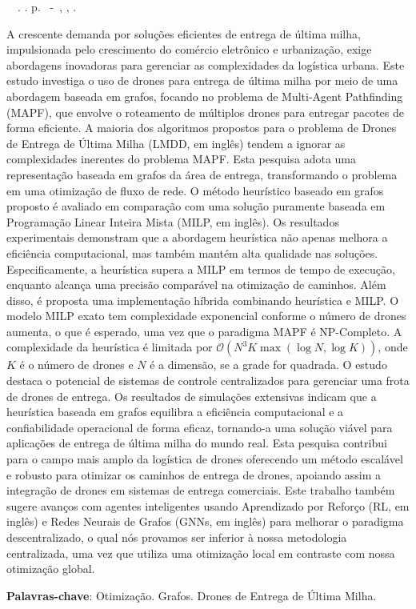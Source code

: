 \setlength{\absparsep}{18pt} %
\begin{resumo}
	\begin{flushleft} 
			\setlength{\absparsep}{0pt} %
			\SingleSpacing 
			\imprimirautorabr~~\textbf{\imprimirtituloresumo}.	\imprimirdata. \pageref{LastPage}p. 
			\imprimirtipotrabalho~-~\imprimirinstituicao, \imprimirlocal, \imprimirdata. 
 	\end{flushleft}
\OnehalfSpacing 	

A crescente demanda por soluções eficientes de entrega de última milha, impulsionada pelo crescimento do comércio eletrônico e urbanização, exige abordagens inovadoras para gerenciar as complexidades da logística urbana. Este estudo investiga o uso de drones para entrega de última milha por meio de uma abordagem baseada em grafos, focando no problema de Multi-Agent Pathfinding (MAPF), que envolve o roteamento de múltiplos drones para entregar pacotes de forma eficiente. A maioria dos algoritmos propostos para o problema de Drones de Entrega de Última Milha (LMDD, em inglês) tendem a ignorar as complexidades inerentes do problema MAPF. Esta pesquisa adota uma representação baseada em grafos da área de entrega, transformando o problema em uma otimização de fluxo de rede. O método heurístico baseado em grafos proposto é avaliado em comparação com uma solução puramente baseada em Programação Linear Inteira Mista (MILP, em inglês). Os resultados experimentais demonstram que a abordagem heurística não apenas melhora a eficiência computacional, mas também mantém alta qualidade nas soluções. Especificamente, a heurística supera a MILP em termos de tempo de execução, enquanto alcança uma precisão comparável na otimização de caminhos. Além disso, é proposta uma implementação híbrida combinando heurística e MILP. O modelo MILP exato tem complexidade exponencial conforme o número de drones aumenta, o que é esperado, uma vez que o paradigma MAPF é NP-Completo. A complexidade da heurística é limitada por $\mathcal{O}(N^3 K \max{(\log N, \log K)})$, onde $K$ é o número de drones e $N$ é a dimensão, se a grade for quadrada. O estudo destaca o potencial de sistemas de controle centralizados para gerenciar uma frota de drones de entrega. Os resultados de simulações extensivas indicam que a heurística baseada em grafos equilibra a eficiência computacional e a confiabilidade operacional de forma eficaz, tornando-a uma solução viável para aplicações de entrega de última milha do mundo real. Esta pesquisa contribui para o campo mais amplo da logística de drones oferecendo um método escalável e robusto para otimizar os caminhos de entrega de drones, apoiando assim a integração de drones em sistemas de entrega comerciais. Este trabalho também sugere avanços com agentes inteligentes usando Aprendizado por Reforço (RL, em inglês) e Redes Neurais de Grafos (GNNs, em inglês) para melhorar o paradigma descentralizado, o qual nós provamos ser inferior à nossa metodologia centralizada, uma vez que utiliza uma otimização local em contraste com nossa otimização global.
 

 \textbf{Palavras-chave}: Otimização. Grafos. Drones de Entrega de Última Milha.
\end{resumo}